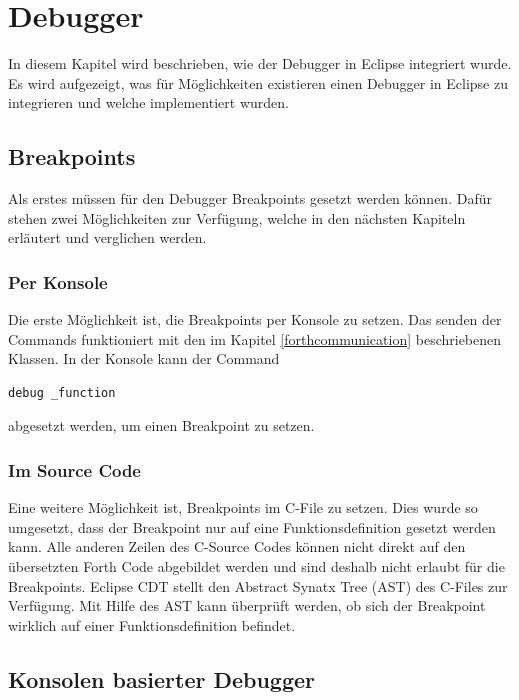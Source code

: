\chapter{Debugger}

In diesem Kapitel wird beschrieben, wie der Debugger in Eclipse integriert wurde. Es wird aufgezeigt, was für Möglichkeiten existieren einen Debugger in Eclipse zu integrieren und welche implementiert wurden.

\section{Breakpoints}
Als erstes müssen für den Debugger Breakpoints gesetzt werden können. Dafür stehen zwei Möglichkeiten zur Verfügung, welche in den nächsten Kapiteln erläutert und verglichen werden.

\subsection{Per Konsole}

Die erste Möglichkeit ist, die Breakpoints per Konsole zu setzen. Das senden der Commands funktioniert mit den im Kapitel \ref{forthcommunication} beschriebenen Klassen. In der Konsole kann der Command

%
\begin{verbatim}
debug _function
\end{verbatim}
%
abgesetzt werden, um einen Breakpoint zu setzen.

\subsection{Im Source Code}

Eine weitere Möglichkeit ist, Breakpoints im C-File zu setzen. Dies wurde so umgesetzt, dass der Breakpoint nur auf eine Funktionsdefinition gesetzt werden kann. Alle anderen Zeilen des C-Source Codes können nicht direkt auf den übersetzten Forth Code abgebildet werden und sind deshalb nicht erlaubt für die Breakpoints.
\newline
Eclipse CDT stellt den Abstract Synatx Tree (AST) des C-Files zur Verfügung. Mit Hilfe des AST kann überprüft werden, ob sich der Breakpoint wirklich auf einer Funktionsdefinition befindet.
\newpage
\section{Konsolen basierter Debugger}


